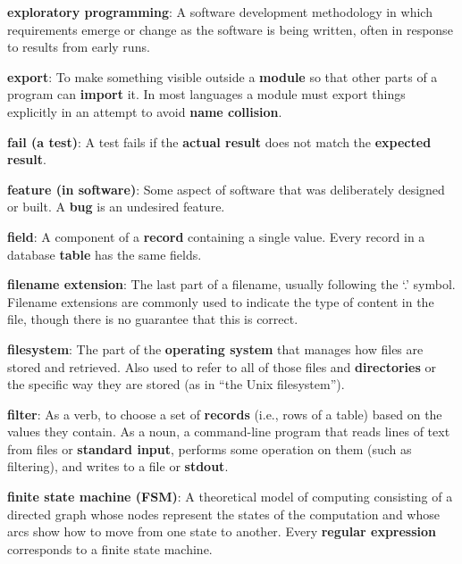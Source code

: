 \documentclass[krantzl]{krantz}
\newcommand{\glosskey}[1]{\textbf{#1}}
\begin{document}
\noindent \textbf{{\newline}\glosskey{exploratory programming}}: 
A software development methodology in which requirements emerge or change as the software is being written, often in response to results from early runs.


\noindent \textbf{{\newline}\glosskey{export}}: 
To make something visible outside a \glosskey{module} so that other parts of a program can \glosskey{import} it. In most languages a module must export things explicitly in an attempt to avoid \glosskey{name collision}.


\noindent \textbf{{\newline}\glosskey{fail (a test)}}: 
A test fails if the \glosskey{actual result} does not match the \glosskey{expected result}.


\noindent \textbf{{\newline}\glosskey{feature (in software)}}: 
Some aspect of software that was deliberately designed or built. A \glosskey{bug} is an undesired feature.


\noindent \textbf{{\newline}\glosskey{field}}: 
A component of a \glosskey{record} containing a single value. Every record in a database \glosskey{table} has the same fields.


\noindent \textbf{{\newline}\glosskey{filename extension}}: 
The last part of a filename, usually following the ‘.’ symbol. Filename extensions are commonly used to indicate the type of content in the file, though there is no guarantee that this is correct.


\noindent \textbf{{\newline}\glosskey{filesystem}}: 
The part of the \glosskey{operating system} that manages how files are stored and retrieved. Also used to refer to all of those files and \glosskey{directories} or the specific way they are stored (as in “the Unix filesystem”).


\noindent \textbf{{\newline}\glosskey{filter}}: 
As a verb, to choose a set of \glosskey{records} (i.e., rows of a table) based on the values they contain. As a noun, a command-line program that reads lines of text from files or \glosskey{standard input}, performs some operation on them (such as filtering), and writes to a file or \glosskey{stdout}.


\noindent \textbf{{\newline}\glosskey{finite state machine} (FSM)}: 
A theoretical model of computing consisting of a directed graph whose nodes represent the states of the computation and whose arcs show how to move from one state to another. Every \glosskey{regular expression} corresponds to a finite state machine.
\end{document}
